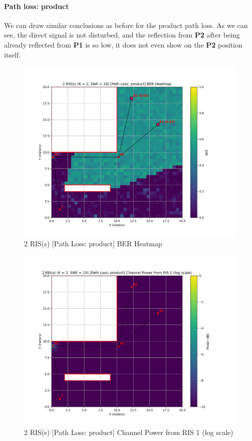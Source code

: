\paragraph*{Path loss: product}
We can draw similar conclusions as before for the product path loss. As we can see, the direct signal is not disturbed, and the reflection from \textbf{P2} after being already reflected from \textbf{P1} is so low, it does not even show on the \textbf{P2} position itself.

\begin{figure}[H]
  \centering
  \includegraphics[width=0.7\linewidth]{imgs/heatmap-simulations/2 RIS(s) (K = 2, SNR = 10) [Path Loss_ product] BER Heatmap.png}
  \caption{2 RIS(s) [Path Loss: product] BER Heatmap}
\end{figure}

\begin{figure}[H]
  \centering
  \includegraphics[width=0.7\linewidth]{imgs/heatmap-simulations/2 RIS(s) (K = 2, SNR = 10) [Path Loss_ product] Channel Power from RIS 1 (log scale).png}
  \caption{2 RIS(s) [Path Loss: product] Channel Power from RIS 1 (log scale)}
\end{figure}

